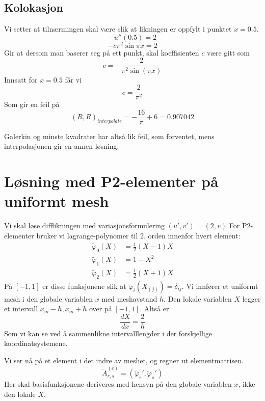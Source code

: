 \documentclass[a4paper, 10pt]{article}
\begin{document}
\subsection{Kolokasjon}
Vi setter at tilnærmingen skal være slik at likningen er oppfylt i punktet $x=0.5$.
\begin{equation}
	-u''(0.5) = 2
\end{equation}
\begin{equation}
	-c\pi^2\sin{\pi x} = 2
\end{equation}
Gir at dersom man baserer seg på ett punkt, skal koeffisienten $c$ være gitt som
\begin{equation}
	c = - \frac{2}{\pi^{2} \sin{\left (\pi x \right )}}
\end{equation}
Innsatt for $x = 0.5$ får vi
\begin{equation}
	c = \frac{2}{\pi^2}
\end{equation}
Som gir en feil på 
\begin{equation}
	(R,R)_{interpolate} = - \frac{16}{\pi} + 6 = 0.907042
\end{equation}

Galerkin og minste kvadrater har altså lik feil, som forventet, mens interpolasjonen gir en annen løsning. 

\section{Løsning med P2-elementer på uniformt mesh}
Vi skal løse difflikningen med variasjonsformulering $(u', v') = (2, v)$
For P2-elementer bruker vi lagrange-polynomer til 2. orden innenfor hvert element:
\begin{align}
\tilde\varphi_0(X) &= \frac{1}{2} (X-1) X \\
\tilde\varphi_1(X) &= 1-X^2 \\
\tilde\varphi_2(X) &= \frac{1}{2} (X+1) X
\end{align}
På $[-1, 1]$ er disse funksjonene slik at $\tilde\varphi_i(X_{(j)}) = \delta_{ij}$.
Vi innfører et uniformt mesh i den globale variablen $x$ med meshavstand $h$. Den lokale variablen $X$ legger et intervall $x_m-h, x_m +h$ over på $[-1, 1]$. Altså er
\begin{equation}
	\frac{dX}{dx} = \frac{2}{h}
\end{equation}
Som vi kan se ved å sammenlikne intervalllengder i der forskjellige koordinatsystemene. 

Vi ser nå på et element i det indre av meshet, og regner ut elementmatrisen.
\begin{equation}
 	\tilde A^{(e)}_{r, s} = (\tilde\varphi_r', \tilde\varphi_s')
 \end{equation} 
 Her skal basisfunksjonene deriveres med hensyn på den globale variablen $x$, ikke den lokale $X$. 
\end{document}
